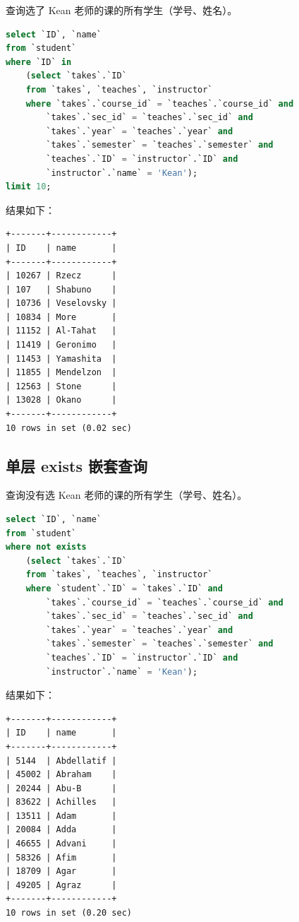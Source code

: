 \documentclass{article}
\begin{document}
查询选了 Kean 老师的课的所有学生（学号、姓名）。

\begin{lstlisting}[language=sql]
select `ID`, `name`
from `student`
where `ID` in
	(select `takes`.`ID`
	from `takes`, `teaches`, `instructor`
    where `takes`.`course_id` = `teaches`.`course_id` and
		`takes`.`sec_id` = `teaches`.`sec_id` and
        `takes`.`year` = `teaches`.`year` and
        `takes`.`semester` = `teaches`.`semester` and
		`teaches`.`ID` = `instructor`.`ID` and
        `instructor`.`name` = 'Kean');
limit 10;
\end{lstlisting}

结果如下：

\begin{lstlisting}
+-------+------------+
| ID    | name       |
+-------+------------+
| 10267 | Rzecz      |
| 107   | Shabuno    |
| 10736 | Veselovsky |
| 10834 | More       |
| 11152 | Al-Tahat   |
| 11419 | Geronimo   |
| 11453 | Yamashita  |
| 11855 | Mendelzon  |
| 12563 | Stone      |
| 13028 | Okano      |
+-------+------------+
10 rows in set (0.02 sec)
\end{lstlisting}

\subsection{单层 exists 嵌套查询}

查询没有选 Kean 老师的课的所有学生（学号、姓名）。

\begin{lstlisting}[language=sql]
select `ID`, `name`
from `student`
where not exists
	(select `takes`.`ID`
	from `takes`, `teaches`, `instructor`
    where `student`.`ID` = `takes`.`ID` and
		`takes`.`course_id` = `teaches`.`course_id` and
		`takes`.`sec_id` = `teaches`.`sec_id` and
        `takes`.`year` = `teaches`.`year` and
        `takes`.`semester` = `teaches`.`semester` and
		`teaches`.`ID` = `instructor`.`ID` and
        `instructor`.`name` = 'Kean');
\end{lstlisting}

结果如下：

\begin{lstlisting}
+-------+------------+
| ID    | name       |
+-------+------------+
| 5144  | Abdellatif |
| 45002 | Abraham    |
| 20244 | Abu-B      |
| 83622 | Achilles   |
| 13511 | Adam       |
| 20084 | Adda       |
| 46655 | Advani     |
| 58326 | Afim       |
| 18709 | Agar       |
| 49205 | Agraz      |
+-------+------------+
10 rows in set (0.20 sec)
\end{lstlisting}
\end{document}
